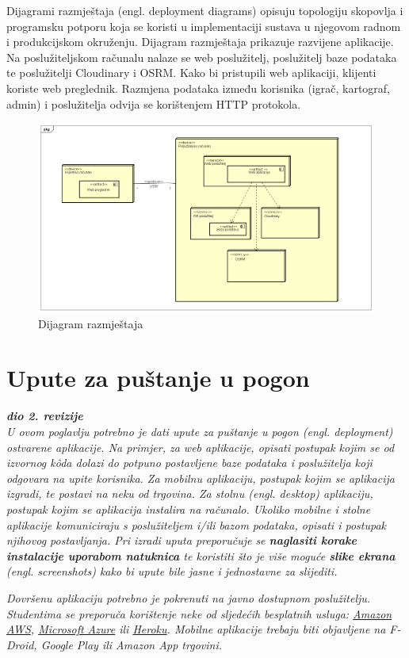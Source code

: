 			{Dijagrami razmještaja (engl. deployment diagrams) opisuju topologiju skopovlja i programsku potporu koja se koristi u implementaciji sustava u njegovom radnom i produkcijskom okruženju. Dijagram razmještaja prikazuje razvijene aplikacije. Na poslužiteljskom računalu nalaze se web poslužitelj, poslužitelj baze podataka te poslužitelji Cloudinary i OSRM. Kako bi pristupili web aplikaciji, klijenti koriste web preglednik. Razmjena podataka između korisnika (igrač, kartograf, admin) i poslužitelja odvija se korištenjem HTTP protokola.}
			\begin{figure}[H]
				\includegraphics[width=\textwidth]{dijagrami/dijagram_razmjestaja} 
				\centering
				\caption{Dijagram razmještaja}
				\label{}
			\end{figure}
			\eject 
		
		\section{Upute za puštanje u pogon}
		
			\textbf{\textit{dio 2. revizije}}\\
		
			 \textit{U ovom poglavlju potrebno je dati upute za puštanje u pogon (engl. deployment) ostvarene aplikacije. Na primjer, za web aplikacije, opisati postupak kojim se od izvornog kôda dolazi do potpuno postavljene baze podataka i poslužitelja koji odgovara na upite korisnika. Za mobilnu aplikaciju, postupak kojim se aplikacija izgradi, te postavi na neku od trgovina. Za stolnu (engl. desktop) aplikaciju, postupak kojim se aplikacija instalira na računalo. Ukoliko mobilne i stolne aplikacije komuniciraju s poslužiteljem i/ili bazom podataka, opisati i postupak njihovog postavljanja. Pri izradi uputa preporučuje se \textbf{naglasiti korake instalacije uporabom natuknica} te koristiti što je više moguće \textbf{slike ekrana} (engl. screenshots) kako bi upute bile jasne i jednostavne za slijediti.}
			
			
			 \textit{Dovršenu aplikaciju potrebno je pokrenuti na javno dostupnom poslužitelju. Studentima se preporuča korištenje neke od sljedećih besplatnih usluga: \href{https://aws.amazon.com/}{Amazon AWS}, \href{https://azure.microsoft.com/en-us/}{Microsoft Azure} ili \href{https://www.heroku.com/}{Heroku}. Mobilne aplikacije trebaju biti objavljene na F-Droid, Google Play ili Amazon App trgovini.}
			
			
			\eject 